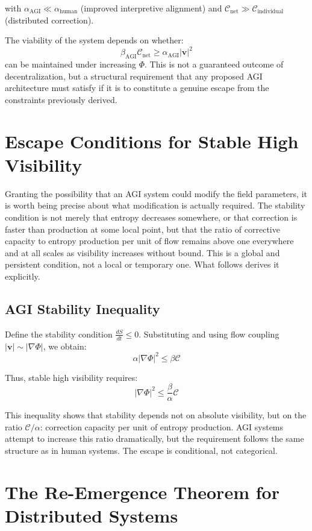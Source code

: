 \documentclass[12pt,a4paper]{article}
\begin{document}
with $\alpha_{\text{AGI}} \ll \alpha_{\text{human}}$ (improved interpretive alignment) and $\mathcal{C}_{\text{net}} \gg \mathcal{C}_{\text{individual}}$ (distributed correction).

The viability of the system depends on whether:
\[
\beta_{\text{AGI}} \mathcal{C}_{\text{net}} \geq \alpha_{\text{AGI}} |\mathbf{v}|^2
\]
can be maintained under increasing $\Phi$. This is not a guaranteed outcome of decentralization, but a structural requirement that any proposed AGI architecture must satisfy if it is to constitute a genuine escape from the constraints previously derived.

\section{Escape Conditions for Stable High Visibility}

Granting the possibility that an AGI system could modify the field parameters, it is worth being precise about what modification is actually required. The stability condition is not merely that entropy decreases somewhere, or that correction is faster than production at some local point, but that the ratio of corrective capacity to entropy production per unit of flow remains above one everywhere and at all scales as visibility increases without bound. This is a global and persistent condition, not a local or temporary one. What follows derives it explicitly.

\subsection{AGI Stability Inequality}

Define the stability condition $\frac{dS}{dt} \leq 0$. Substituting and using flow coupling $|\mathbf{v}| \sim |\nabla \Phi|$, we obtain:
\[
\alpha |\nabla \Phi|^2 \leq \beta \mathcal{C}
\]

Thus, stable high visibility requires:
\[
|\nabla \Phi|^2 \leq \frac{\beta}{\alpha} \mathcal{C}
\]

This inequality shows that stability depends not on absolute visibility, but on the ratio $\mathcal{C}/\alpha$: correction capacity per unit of entropy production. AGI systems attempt to increase this ratio dramatically, but the requirement follows the same structure as in human systems. The escape is conditional, not categorical.

\section{The Re-Emergence Theorem for Distributed Systems}
\end{document}
